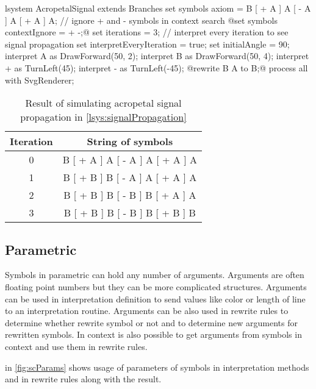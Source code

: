 \begin{Lsystem}[label=lsys:signalPropagation,caption={\lsystem simulating acropetal signal propagation (\autoref{fig:acropetalSignal})}]
lsystem AcropetalSignal extends Branches {
	set symbols axiom = B [ + A ] A [ - A ] A [ + A ] A;
	// ignore + and - symbols in context search
	@set symbols contextIgnore = + -;@
	set iterations = 3;
	// interpret every iteration to see signal propagation
	set interpretEveryIteration = true;
	set initialAngle = 90;
	interpret A as DrawForward(50, 2);
	interpret B as DrawForward(50, 4);
	interpret + as TurnLeft(45);
	interpret - as TurnLeft(-45);
	@rewrite { B } A to B;@
}
process all with SvgRenderer;
\end{Lsystem}


\begin{table}[h]
	\centering
	\begin{tabular}{c c}
   		\toprule
   		Iteration & String of symbols \\
   		\midrule
		0 & B [ + A ] A [ - A ] A [ + A ] A \\
		1 & B [ + B ] B [ - A ] A [ + A ] A \\
		2 & B [ + B ] B [ - B ] B [ + A ] A \\
		3 & B [ + B ] B [ - B ] B [ + B ] B \\
		\bottomrule
	\end{tabular}
	\caption{Result of \lsystem simulating acropetal signal propagation in \autoref{lsys:signalPropagation}}
	\label{fig:signalPropagationTable}
\end{table}


\subsection{Parametric \lsystems}

Symbols in parametric \lsystems can hold any number of arguments.
Arguments are often floating point numbers but they can be more complicated structures.
Arguments can be used in interpretation definition to send values like color or length of line to an interpretation routine.
Arguments can be also used in rewrite rules to determine whether rewrite symbol or not and to determine new arguments for rewritten symbols.
In context \twolsystems is also possible to get arguments from symbols in context and use them in rewrite rules.

\lsystem in \autoref{fig:scParams} shows usage of parameters of symbols in interpretation methods and in rewrite rules along with the result.


